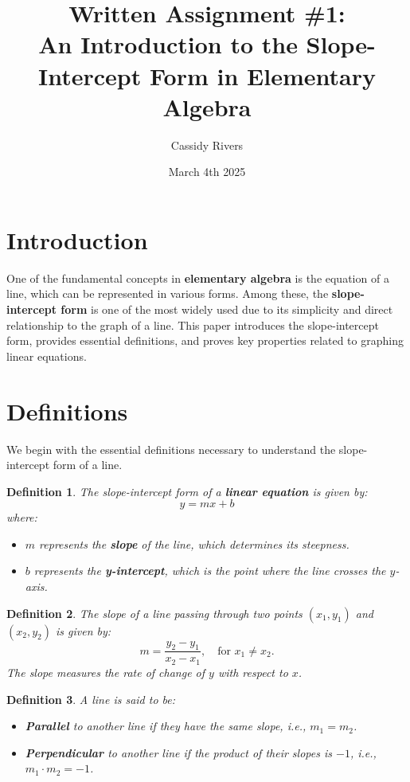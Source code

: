 \documentclass[10pt]{article}
\title{Written Assignment \#1: \\{\Large An Introduction to the Slope-Intercept Form in Elementary Algebra}}
\author{Cassidy Rivers}
\date{March 4th 2025}
\newtheorem{definition}{Definition}
\begin{document}
\maketitle

\section{\textbf{Introduction}}
One of the fundamental concepts in \textbf{elementary algebra} is the equation of a line, which can be represented in various forms. Among these, the \textbf{slope-intercept form} is one of the most widely used due to its simplicity and direct relationship to the graph of a line. This paper introduces the slope-intercept form, provides essential definitions, and proves key properties related to graphing linear equations. 

\section{\textbf{Definitions}}
We begin with the essential definitions necessary to understand the slope-intercept form of a line.

\begin{definition}
The slope-intercept form of a \textbf{linear equation} is given by:
\[
y = mx + b
\]
where:
\begin{itemize}
    \item \( m \) represents the \textbf{slope} of the line, which determines its steepness.
        \item \( b \) represents the \textbf{y-intercept}, which is the point where the line crosses the \( y \)-axis.
\end{itemize}
\end{definition}

\begin{definition}
The slope of a line passing through two points \( (x_1, y_1) \) and \( (x_2, y_2) \) is given by:
\[
m = \frac{y_2 - y_1}{x_2 - x_1}, \quad \text{for } x_1 \neq x_2.
\]
The slope measures the rate of change of \( y \) with respect to \( x \).
\end{definition}

\begin{definition}
A line is said to be:
\begin{itemize}
    \item \textbf{Parallel} to another line if they have the same slope, i.e., \( m_1 = m_2 \).
    \item \textbf{Perpendicular} to another line if the product of their slopes is \( -1 \), i.e., \( m_1 \cdot m_2 = -1 \). 
\end{itemize}
\end{definition}
\end{document}

